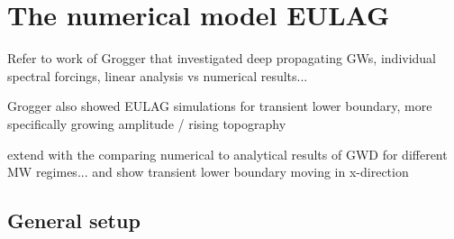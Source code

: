 \chapter{The numerical model EULAG}

Refer to work of Grogger that investigated deep propagating GWs, individual spectral forcings, linear analysis vs numerical results...

Grogger also showed EULAG simulations for transient lower boundary, more specifically growing amplitude / rising topography 

extend with the comparing numerical to analytical results of GWD for different MW regimes...
and show transient lower boundary moving in x-direction

\section{General setup}
\label{sec:EULAG}

